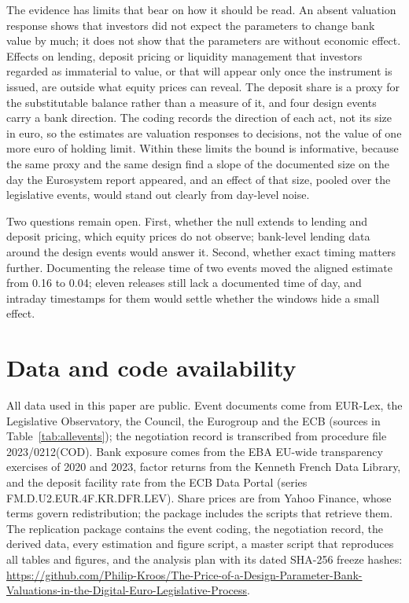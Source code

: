 \documentclass[11pt]{article}
\theoremstyle{plain}\newtheorem{proposition}{Proposition}
\begin{document}
The evidence has limits that bear on how it should be read. An absent valuation response shows that investors did not expect the parameters to change bank value by much; it does not show that the parameters are without economic effect. Effects on lending, deposit pricing or liquidity management that investors regarded as immaterial to value, or that will appear only once the instrument is issued, are outside what equity prices can reveal. The deposit share is a proxy for the substitutable balance rather than a measure of it, and four design events carry a bank direction. The coding records the direction of each act, not its size in euro, so the estimates are valuation responses to decisions, not the value of one more euro of holding limit. Within these limits the bound is informative, because the same proxy and the same design find a slope of the documented size on the day the Eurosystem report appeared, and an effect of that size, pooled over the legislative events, would stand out clearly from day-level noise.

Two questions remain open. First, whether the null extends to lending and deposit pricing, which equity prices do not observe; bank-level lending data around the design events would answer it. Second, whether exact timing matters further. Documenting the release time of two events moved the aligned estimate from 0.16 to 0.04; eleven releases still lack a documented time of day, and intraday timestamps for them would settle whether the windows hide a small effect.


\clearpage

\section*{Data and code availability}
All data used in this paper are public. Event documents come from EUR-Lex, the Legislative Observatory, the Council, the Eurogroup and the ECB (sources in Table~\ref{tab:allevents}); the negotiation record is transcribed from procedure file 2023/0212(COD). Bank exposure comes from the EBA EU-wide transparency exercises of 2020 and 2023, factor returns from the Kenneth French Data Library, and the deposit facility rate from the ECB Data Portal (series FM.D.U2.EUR.4F.KR.DFR.LEV). Share prices are from Yahoo Finance, whose terms govern redistribution; the package includes the scripts that retrieve them. The replication package contains the event coding, the negotiation record, the derived data, every estimation and figure script, a master script that reproduces all tables and figures, and the analysis plan with its dated SHA-256 freeze hashes: \url{https://github.com/Philip-Kroos/The-Price-of-a-Design-Parameter-Bank-Valuations-in-the-Digital-Euro-Legislative-Process}.
\end{document}
